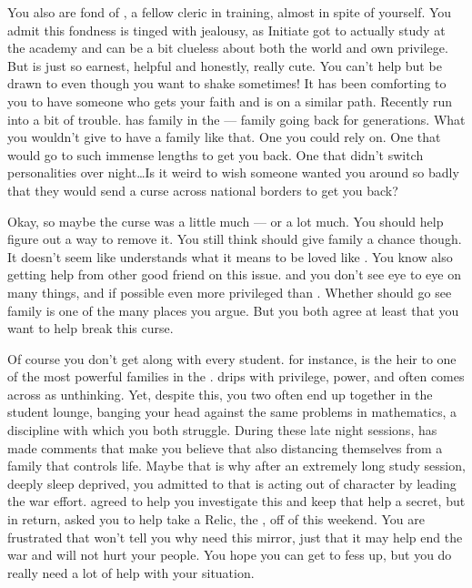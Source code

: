 \documentclass[char]{GL2020}
\begin{document}
You also are fond of \cInitiate{\full}, a fellow cleric in training, almost in spite of yourself. You admit this fondness is tinged with jealousy, as Initiate{} got to actually study at the academy and \cInitiate{\they} can be a bit clueless about both the world and \cInitiate{\their} own privilege. But \cInitiate{} is just so earnest, helpful and honestly, really cute. You can’t help but be drawn to \cInitiate{\them} even though you want to shake \cInitiate{\them} sometimes! It has been comforting to you to have someone who gets your faith and is on a similar path. Recently \cInitiate{\theyhave} run into a bit of trouble. \cInitiate{} has family in the \pFarm{} — family going back for generations. What you wouldn’t give to have a family like that. One you could rely on. One that would go to such immense lengths to get you back. One that didn’t switch personalities over night\ldots Is it weird to wish someone wanted you around so badly that they would send a curse across national borders to get you back?  

Okay, so maybe the curse was a little much — or a lot much. You should help \cInitiate{} figure out a way to remove it. You still think \cInitiate{\they} should give \cInitiate{\their} family a chance though. It doesn’t seem like \cInitiate{} understands what it means to be loved like \cInitiate{\theyare}. You know \cInitiate{\theyare} also getting help from \cInitiate{\their} other good friend \cPresident{\full} on this issue. \cPresident{} and you don’t see eye to eye on many things, and if possible \cPresident{\theyare} even more privileged than \cInitiate{}. Whether \cInitiate{} should go see \cInitiate{\their} family is one of the many places you argue. But you both agree at least that you want to help \cInitiate{} break this curse.

Of course you don’t get along with every student. \cHeir{\full} for instance, is the heir to one of the most powerful families in the \pTech{}. \cHeir{} drips with privilege, power, and often comes across as unthinking. Yet, despite this, you two often end up together in the student lounge, banging your head against the same problems in mathematics, a discipline with which you both struggle. During these late night sessions, \cHeir{} has made comments that make you believe that \cHeir{\theyare} also distancing themselves from a family that controls \cHeir{\their} life. Maybe that is why after an extremely long study session, deeply sleep deprived, you admitted to \cHeir{} that \cLoud{} is acting out of character by leading the war effort. \cHeir{} agreed to help you investigate this and keep that help a secret, but in return, \cHeir{\they} asked you to help \cHeir{\them} take a Relic, the  \iMirror{}, off of \cHeir{\their} \cDiplomat{\auncle} this weekend. You are frustrated that \cHeir{\they} won’t tell you why \cHeir{\they} need this mirror, just that it may help end the war and will not hurt your people. You hope you can get \cHeir{\them} to fess up, but you do really need a lot of help with your situation.
\end{document}
